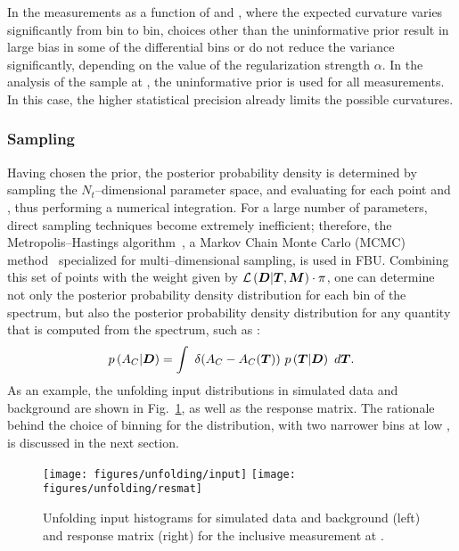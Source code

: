 In the measurements as a function of \mtt{} and \ytt{}, where the
expected curvature varies significantly from bin to bin, choices
other than the uninformative prior result in large bias in some of
the differential bins or do not reduce the variance significantly,
depending on the value of the regularization strength $\alpha{}$.
In the analysis of the sample at \eighttev{}, the uninformative
prior is used for all measurements. In this case, the higher
statistical precision already limits the possible curvatures.

\subsubsection{Sampling}
\label{sec:sampling}
Having chosen the prior, the posterior probability density
\conditionalProb{\Truth{}}{\Data{}} is determined by sampling the
$N_t$--dimensional parameter space, and evaluating for each point
\conditionalLhood{\Data{}}{\Truth{}} and \prior{}, thus performing a
numerical integration. For a large number of parameters, direct
sampling techniques become extremely inefficient; therefore, the
Metropolis--Hastings algorithm~\cite{metropolis}, a Markov
Chain Monte Carlo (MCMC) method~\cite{MR2476411} specialized for
multi--dimensional sampling, is used in FBU.
Combining this set of points with the weight given by
$\mathcal{L}\left(\boldsymbol{D}{}|\boldsymbol{T}{},\boldsymbol{M}{}\right)\cdot{}\pi{}$, one
can determine not only the posterior probability density distribution
for each bin of the spectrum, but also the posterior probability
density distribution for any quantity that is computed from the
spectrum, such as \ac{}:
\begin{equation}
p\left(A_C{}|\boldsymbol{D}{}\right) = 
\int~
\delta(A_C{}-A_C{}(\boldsymbol{T}{}))~
p\left(\boldsymbol{T}{}|\boldsymbol{D}{}\right)~d\boldsymbol{T}{}.
\end{equation}
As an example, the unfolding input \dy{} distributions in simulated data and
background are shown in Fig.~\ref{fig:unfinput}, as well as the
response matrix. The rationale behind the choice of binning for the \dy{} distribution,
with two narrower bins at low \dy{}, is discussed in the next section.
%
\begin{figure}[!htb]\centering
  \texttt{[image: figures/unfolding/input]}
  \texttt{[image: figures/unfolding/resmat]}
  \caption{
    \label{fig:unfinput}
   Unfolding input histograms for simulated data and background (left) and
   response matrix (right) for the inclusive \ac{} measurement at \seventev{}.
   }
\end{figure}
